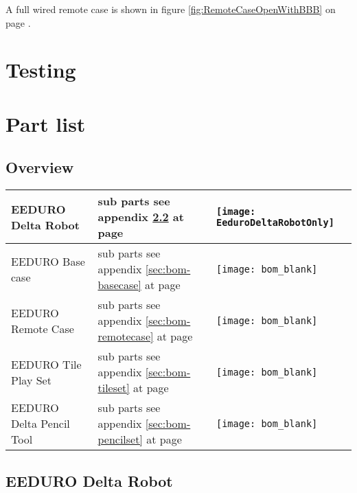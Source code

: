 A full wired remote case is shown in figure \ref{fig:RemoteCaseOpenWithBBB} on page \pageref{fig:RemoteCaseOpenWithBBB}.

\section{Testing}



\appendix
\addchap{\appendixname}
\makeatletter
\makeatother{}
\renewcommand{\thetable}{\Alph{section}.\arabic{table}}
\renewcommand{\thesection}{\Alph{section}}

\section{Part list}
\label{sec:bom}

\subsection{Overview}

\begin{tabular}{m{5cm} m{7cm} m{2cm}}
\hline
EEDURO Delta Robot          & sub parts see appendix \ref{sec:bom-robot} at page \pageref{sec:bom-robot}           & \texttt{[image: EeduroDeltaRobotOnly]} \\
\hline
EEDURO Base case            & sub parts see appendix \ref{sec:bom-basecase} at page \pageref{sec:bom-basecase}     & \texttt{[image: bom\_blank]}            \\
\hline
EEDURO Remote Case          & sub parts see appendix \ref{sec:bom-remotecase} at page \pageref{sec:bom-remotecase} & \texttt{[image: bom\_blank]}            \\
\hline
EEDURO Tile Play Set        & sub parts see appendix \ref{sec:bom-tileset} at page \pageref{sec:bom-tileset}       & \texttt{[image: bom\_blank]}            \\
\hline
EEDURO Delta Pencil Tool    & sub parts see appendix \ref{sec:bom-pencilset} at page \pageref{sec:bom-pencilset}   & \texttt{[image: bom\_blank]}            \\
\hline
\end{tabular}

\subsection{EEDURO Delta Robot}
\label{sec:bom-robot}

